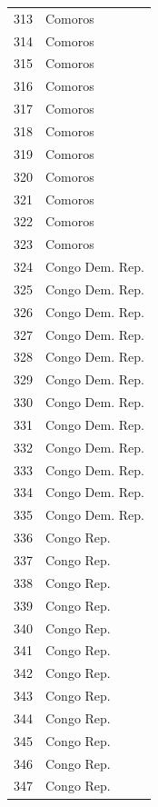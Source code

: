 \documentclass[
  letterpaper,
  DIV=11,
  numbers=noendperiod]{scrreprt}
\begin{document}
\begin{tabular}{ll}
313  &                   Comoros \\
314  &                   Comoros \\
315  &                   Comoros \\
316  &                   Comoros \\
317  &                   Comoros \\
318  &                   Comoros \\
319  &                   Comoros \\
320  &                   Comoros \\
321  &                   Comoros \\
322  &                   Comoros \\
323  &                   Comoros \\
324  &           Congo Dem. Rep. \\
325  &           Congo Dem. Rep. \\
326  &           Congo Dem. Rep. \\
327  &           Congo Dem. Rep. \\
328  &           Congo Dem. Rep. \\
329  &           Congo Dem. Rep. \\
330  &           Congo Dem. Rep. \\
331  &           Congo Dem. Rep. \\
332  &           Congo Dem. Rep. \\
333  &           Congo Dem. Rep. \\
334  &           Congo Dem. Rep. \\
335  &           Congo Dem. Rep. \\
336  &                Congo Rep. \\
337  &                Congo Rep. \\
338  &                Congo Rep. \\
339  &                Congo Rep. \\
340  &                Congo Rep. \\
341  &                Congo Rep. \\
342  &                Congo Rep. \\
343  &                Congo Rep. \\
344  &                Congo Rep. \\
345  &                Congo Rep. \\
346  &                Congo Rep. \\
347  &                Congo Rep. \\

\end{tabular}
\end{document}
